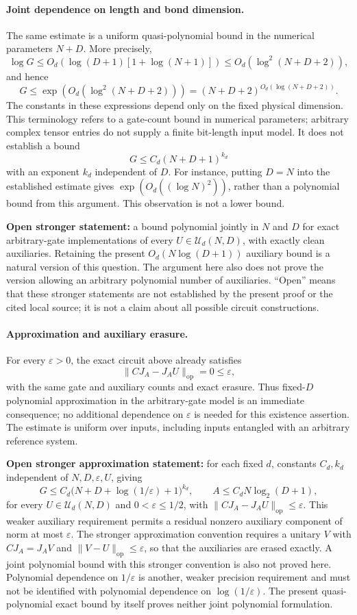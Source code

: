 \documentclass[11pt]{article}
\begin{document}
\paragraph{Joint dependence on length and bond dimension.}
The same estimate is a uniform quasi-polynomial bound in the numerical
parameters $N+D$. More precisely,
\[
 \log G\le O_d\!\left(
       \log(D+1)[1+\log(N+1)]\right)
 \le O_d\!\left(\log^2(N+D+2)\right),
\]
and hence
\[
 G\le \exp\!\left(O_d(\log^2(N+D+2))\right)
       =(N+D+2)^{O_d(\log(N+D+2))}.
\]
The constants in these expressions depend only on the fixed physical
dimension. This terminology refers to a gate-count bound in numerical
parameters; arbitrary complex tensor entries do not supply a finite
bit-length input model.
It does not establish a bound
\[
 G\le C_d(N+D+1)^{k_d}
\]
with an exponent $k_d$ independent of $D$.
For instance, putting $D=N$ into the established estimate gives
$\exp(O_d((\log N)^2))$, rather than a polynomial bound from this
argument. This observation is not a lower bound.

\textbf{Open stronger statement:} a bound polynomial jointly in $N$
and $D$ for exact arbitrary-gate implementations of every
$U\in\mathcal U_d(N,D)$, with exactly clean auxiliaries.
Retaining the present $O_d(N\log(D+1))$ auxiliary bound is a natural
version of this question. The argument here also does not prove the
version allowing an arbitrary polynomial number of auxiliaries.
``Open'' means that these stronger statements are not established by
the present proof or the cited local source; it is not a claim about
all possible circuit constructions.

\paragraph{Approximation and auxiliary erasure.}
For every $\varepsilon>0$, the exact circuit above already satisfies
\[
 \|C J_A-J_AU\|_{\mathrm{op}}=0\le\varepsilon,
\]
with the same gate and auxiliary counts and exact erasure.
Thus fixed-$D$ polynomial approximation in the arbitrary-gate model
is an immediate consequence; no additional dependence on
$\varepsilon$ is needed for this existence assertion.
The estimate is uniform over inputs, including inputs entangled with
an arbitrary reference system.

\textbf{Open stronger approximation statement:} for each fixed $d$,
constants $C_d,k_d$ independent of $N,D,\varepsilon,U$, giving
\[
 G\le C_d\bigl(N+D+\log(1/\varepsilon)+1\bigr)^{k_d},
 \qquad A\le C_dN\log_2(D+1),
\]
for every $U\in\mathcal U_d(N,D)$ and $0<\varepsilon\le1/2$, with
$\|C J_A-J_AU\|_{\mathrm{op}}\le\varepsilon$.
This weaker auxiliary requirement permits a residual nonzero
auxiliary component of norm at most $\varepsilon$.
The stronger approximation convention requires a unitary $V$ with
$C J_A=J_AV$ and $\|V-U\|_{\mathrm{op}}\le\varepsilon$, so that the
auxiliaries are erased exactly. A joint polynomial bound with this
stronger convention is also not proved here.
Polynomial dependence on $1/\varepsilon$ is another, weaker precision
requirement and must not be identified with polynomial dependence on
$\log(1/\varepsilon)$. The present quasi-polynomial exact bound by
itself proves neither joint polynomial formulation.
\end{document}
